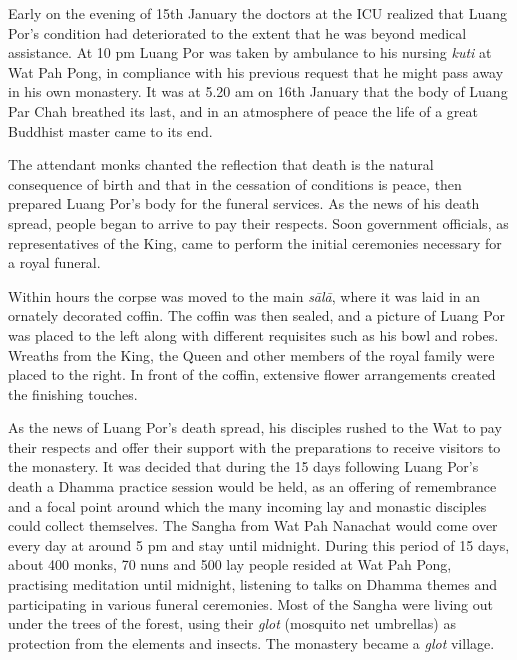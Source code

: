 Early on the evening of 15th January the doctors at the ICU realized
that Luang Por's condition had deteriorated to the extent that he was
beyond medical assistance. At 10 pm Luang Por was taken by ambulance to
his nursing \emph{kuti} at Wat Pah Pong, in compliance with his previous
request that he might pass away in his own monastery. It was at 5.20 am
on 16th January that the body of Luang Par Chah breathed its last, and
in an atmosphere of peace the life of a great Buddhist master came to
its end. 

The attendant monks chanted the reflection that death is the natural
consequence of birth and that in the cessation of conditions is peace, 
then prepared Luang Por's body for the funeral services. As the news of
his death spread, people began to arrive to pay their respects. Soon
government officials, as representatives of the King, came to perform
the initial ceremonies necessary for a royal funeral. 

Within hours the corpse was moved to the main \emph{sālā}, where it was
laid in an ornately decorated coffin. The coffin was then sealed, and a
picture of Luang Por was placed to the left along with different
requisites such as his bowl and robes. Wreaths from the King, the Queen
and other members of the royal family were placed to the right. In front
of the coffin, extensive flower arrangements created the finishing
touches. 

As the news of Luang Por's death spread, his disciples rushed to the Wat
to pay their respects and offer their support with the preparations to
receive visitors to the monastery. It was decided that during the 15
days following Luang Por's death a Dhamma practice session would be
held, as an offering of remembrance and a focal point around which the
many incoming lay and monastic disciples could collect themselves. The
Sangha from Wat Pah Nanachat would come over every day at around 5 pm
and stay until midnight. During this period of 15 days, about 400 monks, 
70 nuns and 500 lay people resided at Wat Pah Pong, practising
meditation until midnight, listening to talks on Dhamma themes and
participating in various funeral ceremonies. Most of the Sangha were
living out under the trees of the forest, using their \emph{glot}
 (mosquito net umbrellas) as protection from the elements and insects. 
The monastery became a \emph{glot} village. 

